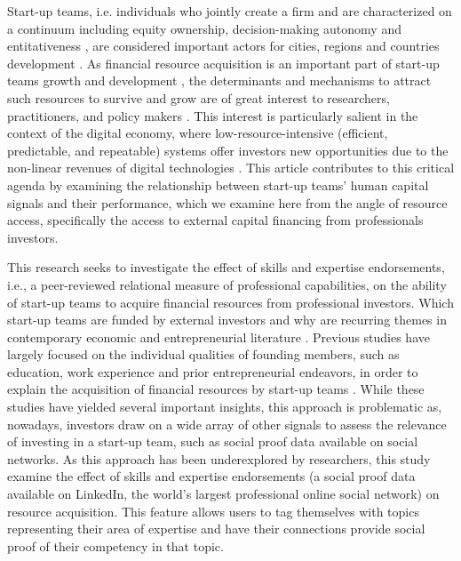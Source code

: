 \documentclass[12pt]{article}
\begin{document}
Start-up teams, i.e. individuals who jointly create a firm and are characterized on a continuum including equity ownership, decision-making autonomy and entitativeness \citep{kamm1990entrepreneurial, knight2020start}, are considered important actors for cities, regions and countries development \citep{audretsch2001linking, autio2016entrepreneurship}. As financial resource acquisition is an important part of start-up teams growth and development \citep{rosenbusch2013does}, the determinants and mechanisms to attract such resources to survive and grow are of great interest to researchers, practitioners, and policy makers \citep{EUcommission2015digital}. This interest is particularly salient in the context of the digital economy, where low-resource-intensive (efficient, predictable, and repeatable) systems offer investors new opportunities due to the non-linear revenues of digital technologies \citep{nambisan2017digital, sahut2021age}. This article contributes to this critical agenda by examining the relationship between start-up teams' human capital signals and their performance, which we examine here from the angle of resource access, specifically the access to external capital financing from professionals investors.

This research seeks to investigate the effect of skills and expertise endorsements, i.e., a peer-reviewed relational measure of professional capabilities, on the ability of start-up teams to acquire financial resources from professional investors. Which start-up teams are funded by external investors and why are recurring themes in contemporary economic and entrepreneurial literature \citep{baum2004picking, beckman2007early, bernstein2017attracting, franke2006you, franke2008venture, plummer2016better, kaplan2009should, shane2002network}. Previous studies have largely focused on the individual qualities of founding members, such as education, work experience and prior entrepreneurial endeavors, in order to explain the acquisition of financial resources by start-up teams \citep{shane2002network, hsu2007experienced}. While these studies have yielded several important insights, this approach is problematic as, nowadays, investors draw on a wide array of other signals to assess the relevance of investing in a start-up team, such as social proof data available on social networks. As this approach has been underexplored by researchers, this study examine the effect of skills and expertise endorsements (a social proof data available on LinkedIn, the world's largest professional online social network) on resource acquisition. This feature allows users to tag themselves with topics representing their area of expertise and have their connections provide social proof of their competency in that topic.
\end{document}
